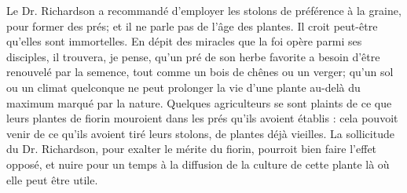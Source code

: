 Le Dr. Richardson a recommandé d’employer les stolons de préférence à la graine, pour former des prés; et il ne parle pas de l’âge des plantes. Il croit peut-être qu’elles sont immortelles. En dépit des miracles que la foi opère parmi ses disciples, il trouvera, je pense, qu’un pré de son herbe favorite a besoin d’être renouvelé par la semence, tout comme un bois de chênes ou un verger; qu’un sol ou un climat quelconque ne peut prolonger la vie d’une plante au-delà du maximum marqué par la nature. Quelques agriculteurs se sont plaints de ce que leurs plantes de fiorin mouroient dans les\setcounter{page}{260} prés qu'ils avoient établis : cela pouvoit venir de ce qu'ils avoient tiré leurs stolons, de plantes déjà vieilles.
La sollicitude du Dr. Richardson, pour exalter le mérite du fiorin, pourroit bien faire l'effet opposé, et nuire pour un temps à la diffusion de la culture de cette plante là où elle peut être utile.
